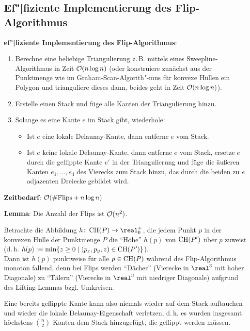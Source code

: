 \pagebreak

\subsection{%
    Ef"|fiziente Implementierung des Flip-Algorithmus%
}

\textbf{ef"|fiziente Implementierung des Flip-Algorithmus}:
\begin{enumerate}
    \item
    Berechne eine beliebige Triangulierung z.\,B. mittels eines Sweepline-Algorithmus in Zeit
    $\mathcal{O}(n \log n)$
    (oder konstruiere zunächst aus der Punktmenge wie im Graham-Scan-Algorith"-mus
    für konvexe Hüllen ein Polygon und trianguliere dieses dann, beides geht in Zeit
    $\mathcal{O}(n \log n)$).
    
    \item
    Erstelle einen Stack und füge alle Kanten der Triangulierung hinzu.
    
    \item
    Solange es eine Kante $e$ im Stack gibt, wiederhole:
    \begin{itemize}
        \item
        Ist $e$ eine lokale Delaunay-Kante, dann entferne $e$ vom Stack.
        
        \item
        Ist $e$ keine lokale Delaunay-Kante, dann entferne $e$ vom Stack,
        ersetze $e$ durch die geflippte Kante $e'$ in der Triangulierung und
        füge die äußeren Kanten $e_1, \dotsc, e_4$ des Vierecks zum Stack hinzu,
        das durch die beiden zu $e$ adjazenten Dreiecke gebildet wird.
    \end{itemize}
\end{enumerate}

\textbf{Zeitbedarf}: $\mathcal{O}(\text{\#Flips} + n\log n)$

\linie

\textbf{Lemma}:
Die Anzahl der Flips ist $\mathcal{O}(n^2)$.

\begin{Beweis}
    Betrachte die Abbildung $h\colon \CH(P) \rightarrow \real_0^+$,
    die jedem Punkt $p$ in der konvexen
    Hülle der Punktmenge $P$ die "`Höhe"' $h(p)$ von $\operatorname{CH}(P')$ über $p$ zuweist\\
    (d.\,h. $h(p) := \min\{z \ge 0 \;|\; (p_x, p_y, z) \in \operatorname{CH}(P')\}$).\\
    Dann ist $h(p)$ punktweise für alle $p \in \operatorname{CH}(P)$ während des Flip-Algorithmus monoton
    fallend, denn bei Flips werden "`Dächer"'
    (Vierecke in $\real^3$ mit hoher Diagonale)
    zu "`Tälern"' (Vierecke in $\real^3$ mit niedriger Diagonale)
    aufgrund des Lifting-Lemmas bzgl. Umkreisen.
    
    Eine bereits geflippte Kante kann also niemals wieder auf dem Stack auftauchen
    und wieder die lokale Delaunay-Eigenschaft verletzen,
    d.\,h. es wurden insgesamt höchstens $\binom{n}{2}$ Kanten dem Stack hinzugefügt,
    die geflippt werden müssen.
\end{Beweis}

